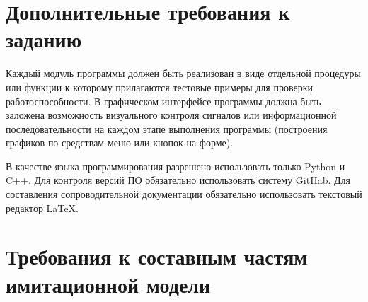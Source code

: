 \section{Дополнительные требования к заданию}

Каждый модуль программы должен быть реализован в виде отдельной процедуры или функции к которому прилагаются тестовые примеры для проверки работоспособности. В графическом интерфейсе программы должна быть заложена возможность визуального контроля сигналов или информационной последовательности на каждом этапе выполнения программы (построения графиков по средствам меню или кнопок на форме).

 В качестве языка программирования разрешено использовать только Python и C++. Для контроля версий ПО обязательно использовать систему GitHab. Для составления сопроводительной документации обязательно использовать текстовый редактор LaTeX.

\section{Требования к составным частям имитационной модели}

